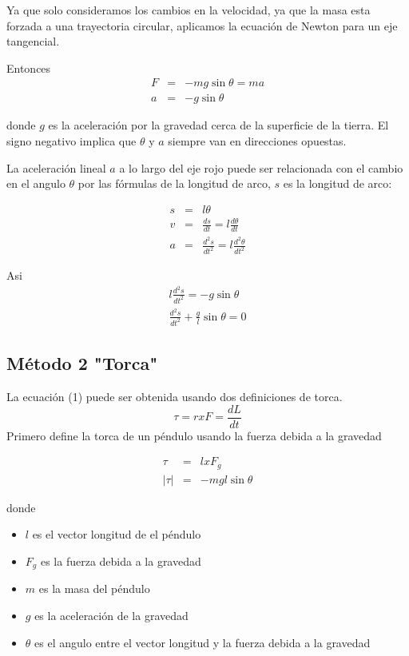 \documentclass[12pt]{article}
\begin{document}
Ya que solo consideramos los cambios en la velocidad, ya que la masa esta forzada a una trayectoria circular, aplicamos la ecuación de Newton para un eje tangencial.

Entonces
\begin{eqnarray}
\nonumber F & = & -mg\sin\theta =ma \\
\nonumber a & = & -g\sin\theta
\end{eqnarray}

donde $g$ es la aceleración por la gravedad cerca de la superficie de la tierra.
El signo negativo implica que $\theta$ y $a$ siempre van en direcciones opuestas.

La aceleración lineal $a$ a lo largo del eje rojo puede ser relacionada con el cambio en el angulo $\theta$ por las fórmulas de la longitud de arco, $s$ es la longitud de arco:

\begin{eqnarray}
\nonumber s &  = & l\theta \\
\nonumber v & = & \frac{ds}{dt}  =  l\frac{d\theta}{dt} \\
\nonumber a  & = &  \frac{d^2s}{dt^2}  =  l\frac{d^2\theta}{dt^2}
\end{eqnarray}

Asi 
 \begin{eqnarray}
 \nonumber l \frac{d^2s}{dt^2} = -g \sin\theta \\
 \nonumber  \frac{d^2s}{dt^2} + \frac{g}{l} \sin \theta =  0
 \end{eqnarray}

 \subsection{Método 2 "Torca"}
 La ecuación (1) puede ser obtenida usando dos definiciones de torca.
 $$ \tau = r xF = \frac{dL}{dt}$$ 
 Primero define la torca de un péndulo usando la fuerza debida a la gravedad
 
\begin{eqnarray}
\nonumber \tau & = & l x F_g \\
\nonumber |\tau| & = & -mgl\sin\theta
\end{eqnarray}

donde 
\begin{itemize}
\item $l$ es el vector longitud de el péndulo
\item $F_g$ es la fuerza debida a la gravedad
\item $m$ es la masa del péndulo
\item $g$ es la aceleración de la gravedad
\item $\theta$ es el angulo entre el vector longitud  y la fuerza debida a la gravedad
\end{itemize}
\end{document}
